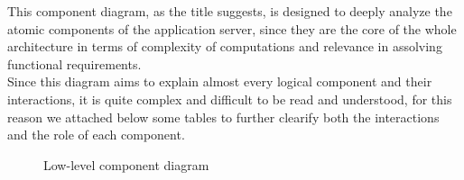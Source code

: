 This component diagram, as the title suggests, is designed to deeply analyze the atomic components of the application server, since they are the core of the whole architecture in terms of complexity of computations and relevance in assolving functional requirements. \\
Since this diagram aims to explain almost every logical component and their interactions, it is quite complex and difficult to be read and understood, for this reason we attached below some tables to further clearify both the interactions and the role of each component. \\



\begin{figure} 
\begin{center}

\caption{Low-level component diagram} 
\label{fig:llcomponentdiagram} 


\end{center}
\end{figure} 
